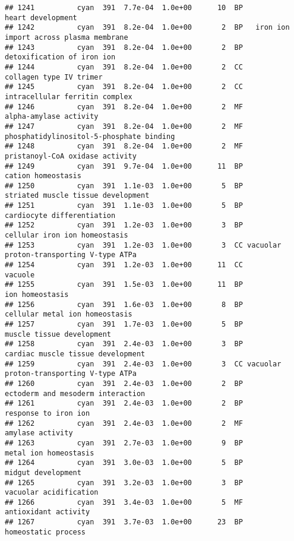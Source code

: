 \documentclass[]{article}
\begin{document}
\begin{verbatim}
## 1241          cyan  391  7.7e-04  1.0e+00      10  BP                        heart development
## 1242          cyan  391  8.2e-04  1.0e+00       2  BP   iron ion import across plasma membrane
## 1243          cyan  391  8.2e-04  1.0e+00       2  BP               detoxification of iron ion
## 1244          cyan  391  8.2e-04  1.0e+00       2  CC                  collagen type IV trimer
## 1245          cyan  391  8.2e-04  1.0e+00       2  CC           intracellular ferritin complex
## 1246          cyan  391  8.2e-04  1.0e+00       2  MF                   alpha-amylase activity
## 1247          cyan  391  8.2e-04  1.0e+00       2  MF phosphatidylinositol-5-phosphate binding
## 1248          cyan  391  8.2e-04  1.0e+00       2  MF          pristanoyl-CoA oxidase activity
## 1249          cyan  391  9.7e-04  1.0e+00      11  BP                       cation homeostasis
## 1250          cyan  391  1.1e-03  1.0e+00       5  BP       striated muscle tissue development
## 1251          cyan  391  1.1e-03  1.0e+00       5  BP               cardiocyte differentiation
## 1252          cyan  391  1.2e-03  1.0e+00       3  BP            cellular iron ion homeostasis
## 1253          cyan  391  1.2e-03  1.0e+00       3  CC vacuolar proton-transporting V-type ATPa
## 1254          cyan  391  1.2e-03  1.0e+00      11  CC                                  vacuole
## 1255          cyan  391  1.5e-03  1.0e+00      11  BP                          ion homeostasis
## 1256          cyan  391  1.6e-03  1.0e+00       8  BP           cellular metal ion homeostasis
## 1257          cyan  391  1.7e-03  1.0e+00       5  BP                muscle tissue development
## 1258          cyan  391  2.4e-03  1.0e+00       3  BP        cardiac muscle tissue development
## 1259          cyan  391  2.4e-03  1.0e+00       3  CC vacuolar proton-transporting V-type ATPa
## 1260          cyan  391  2.4e-03  1.0e+00       2  BP        ectoderm and mesoderm interaction
## 1261          cyan  391  2.4e-03  1.0e+00       2  BP                     response to iron ion
## 1262          cyan  391  2.4e-03  1.0e+00       2  MF                         amylase activity
## 1263          cyan  391  2.7e-03  1.0e+00       9  BP                    metal ion homeostasis
## 1264          cyan  391  3.0e-03  1.0e+00       5  BP                       midgut development
## 1265          cyan  391  3.2e-03  1.0e+00       3  BP                   vacuolar acidification
## 1266          cyan  391  3.4e-03  1.0e+00       5  MF                     antioxidant activity
## 1267          cyan  391  3.7e-03  1.0e+00      23  BP                      homeostatic process

\end{verbatim}
\end{document}

